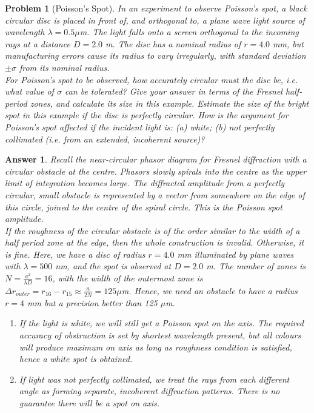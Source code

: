 \documentclass[a4paper]{article}
\newtheorem{ans}{Answer}[section]
\theoremstyle{new}
\newtheorem{qns}{Problem}[section]
\begin{document}
\begin{qns}[Poisson's Spot]
In an experiment to observe Poisson’s spot, a black circular disc is placed in front of, and orthogonal to, a plane wave light source of wavelength $\lambda=0.5\mu$m. The light falls onto a screen orthogonal to the incoming rays at a distance $D = 2.0$ m. The disc has a nominal radius of $r = 4.0$ mm, but manufacturing errors cause its radius to vary irregularly, with standard deviation $\pm\sigma$ from its nominal radius.\\[5pt]
For Poisson’s spot to be observed, how accurately circular must the disc be, i.e. what value of $\sigma$ can be tolerated? Give your answer in terms of the Fresnel half-period zones, and calculate its size in this example. Estimate the size of the bright spot in this example if the disc is perfectly circular. How is the argument for Poisson’s spot affected if the incident light is: (a) white; (b) not perfectly collimated (i.e. from an extended, incoherent source)?
\end{qns}
\begin{ans}
Recall the near-circular phasor diagram for Fresnel diffraction with a circular obstacle at the centre. Phasors slowly spirals into the centre as the upper limit of integration becomes large. The diffracted amplitude from a perfectly circular, small obstacle is represented by a vector from somewhere on the edge of this circle, joined to the centre of the spiral circle. This is the Poisson spot amplitude.\\[5pt]
If the roughness of the circular obstacle is of the order similar to the width of a half period zone at the edge, then the whole construction is invalid. Otherwise, it is fine. Here, we have a disc of radius $r=4.0$ mm illuminated by plane waves with $\lambda=500$ nm, and the spot is observed at $D=2.0$ m. The number of zones is $N=\frac{a^2}{\lambda D}=16$, with the width of the outermost zone is $\Delta r_{outer}=r_{16}-r_{15}\approx\frac{a}{2N}=125\mu$m. Hence, we need an obstacle to have a radius $r=4$ mm but a precision better than 125 $\mu$m.
\begin{enumerate}[label=(\alph*)]
\item If the light is white, we will still get a Poisson spot on the axis. The required accuracy of obstruction is set by shortest wavelength present, but all colours will produce maximum on axis as long as roughness condition is satisfied, hence a white spot is obtained.
\item If light was not perfectly collimated, we treat the rays from each different angle as forming separate, incoherent diffraction patterns. There is no guarantee there will be a spot on axis.
\end{enumerate}
\end{ans}
\end{document}
